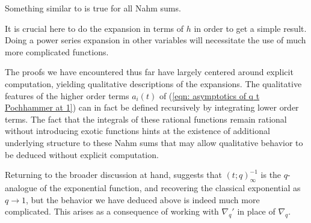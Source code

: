 \begin{remark}
    Something similar to  is true for all Nahm sums. 
\end{remark}
\begin{remark}
    It is crucial here to do the expansion in terms of $h$ in order to get a simple result. Doing a power series expansion in other variables will necessitate the use of much more complicated functions. 
\end{remark}



The proofs we have encountered thus far have largely centered around explicit computation, yielding qualitative descriptions of the expansions. The qualitative features of the higher order terms $a_{i}(t)$ of (\ref{eqn: asymptotics of q t Pochhammer at 1}) can in fact be defined recursively by integrating lower order terms. The fact that the integrals of these rational functions remain rational without introducing exotic functions hints at the existence of additional underlying structure to these Nahm sums that may allow qualitative behavior to be deduced without explicit computation.

Returning to the broader discussion at hand,  suggests that $(t;q)_{\infty}^{-1}$ is the $q$-analogue of the exponential function, and recovering the classical exponential as $q\to 1$, but the behavior we have deduced above is indeed much more complicated. This arises as a consequence of working with $\nabla_{q}'$ in place of $\nabla_{q}$.

